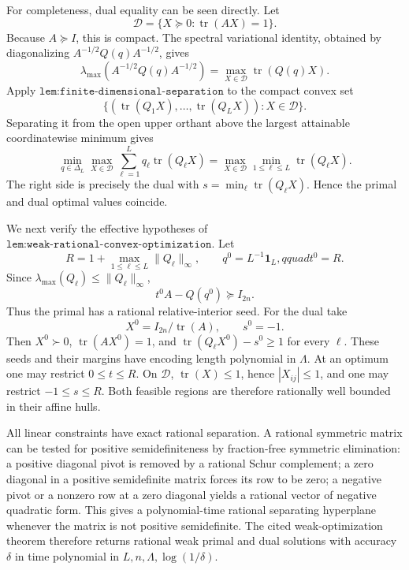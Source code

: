 For completeness, dual equality can be seen directly.  Let
\[
 \mathcal D=\{X\succeq0:\operatorname{tr}(AX)=1\}.
\]
Because \(A\succeq I\), this is compact.  The spectral variational identity, obtained by diagonalizing \(A^{-1/2}Q(q)A^{-1/2}\), gives
\[
 \lambda_{\max}(A^{-1/2}Q(q)A^{-1/2})
 =\max_{X\in\mathcal D}\operatorname{tr}(Q(q)X).
\]
Apply \(\texttt{lem:finite-dimensional-separation}\) to the compact convex set
\[
 \{(\operatorname{tr}(Q_1X),\ldots,\operatorname{tr}(Q_LX)):X\in\mathcal D\}.
\]
Separating it from the open upper orthant above the largest attainable coordinatewise minimum gives
\[
 \min_{q\in\Delta_L}\max_{X\in\mathcal D}\sum_{\ell=1}^Lq_\ell\operatorname{tr}(Q_\ell X)
 =\max_{X\in\mathcal D}\min_{1\le\ell\le L}\operatorname{tr}(Q_\ell X).
\]
The right side is precisely the dual with \(s=\min_\ell\operatorname{tr}(Q_\ell X)\).  Hence the primal and dual optimal values coincide.

We next verify the effective hypotheses of \(\texttt{lem:weak-rational-convex-optimization}\).  Let
\[
 R=1+\max_{1\le\ell\le L}\|Q_\ell\|_\infty,
 \qquad q^0=L^{-1}\mathbf 1_L,qquad t^0=R.
\]
Since \(\lambda_{\max}(Q_\ell)\le\|Q_\ell\|_\infty\),
\[
 t^0A-Q(q^0)\succeq I_{2n}.
\]
Thus the primal has a rational relative-interior seed.  For the dual take
\[
 X^0=I_{2n}/\operatorname{tr}(A),\qquad s^0=-1.
\]
Then \(X^0\succ0\), \(\operatorname{tr}(AX^0)=1\), and \(\operatorname{tr}(Q_\ell X^0)-s^0\ge1\) for every \(\ell\).  These seeds and their margins have encoding length polynomial in \(\Lambda\).  At an optimum one may restrict \(0\le t\le R\).  On \(\mathcal D\), \(\operatorname{tr}(X)\le1\), hence \(|X_{ij}|\le1\), and one may restrict \(-1\le s\le R\).  Both feasible regions are therefore rationally well bounded in their affine hulls.

All linear constraints have exact rational separation.  A rational symmetric matrix can be tested for positive semidefiniteness by fraction-free symmetric elimination: a positive diagonal pivot is removed by a rational Schur complement; a zero diagonal in a positive semidefinite matrix forces its row to be zero; a negative pivot or a nonzero row at a zero diagonal yields a rational vector of negative quadratic form.  This gives a polynomial-time rational separating hyperplane whenever the matrix is not positive semidefinite.  The cited weak-optimization theorem therefore returns rational weak primal and dual solutions with accuracy \(\delta\) in time polynomial in \(L,n,\Lambda,\log(1/\delta)\).

